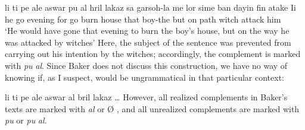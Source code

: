 \ea\label{ex:2:37}
 \gll li ti pe ale aswar pu al hril lakaz sa garsoh-la me lor sime ban dayin fin atake Ii\\
he {\TNS} {\MOD} go evening for go burn house that boy-the  but on path {\PL} witch {\COMP} attack him\\
\glt `He would have gone that evening to burn the boy's house, but on the way he was attacked by witches'
\z
Here, the subject of the sentence was prevented from carrying out his intention by the witches; accordingly, the complement is marked with \textit{pu} \textit{al}. Since Baker does not discuss this construction, we have no way of knowing if, as I suspect,  would be ungrammatical in that particular context:

\ea\label{ex:2:38}
 li ti pe ale aswar al bril lakaz \ldots 
\z
However, all realized complements in Baker's texts are marked with \textit{al} or {\O} , and all unrealized complements are marked with \textit{pu} or \textit{pu} \textit{al.}

